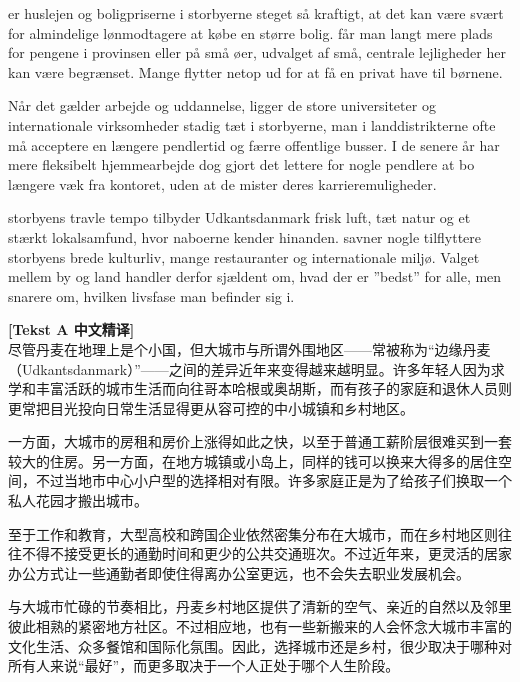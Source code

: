  er huslejen og boligpriserne i storbyerne steget så kraftigt, at det kan være svært for almindelige lønmodtagere at købe en større bolig.  får man langt mere plads for pengene i provinsen eller på små øer,  udvalget af små, centrale lejligheder her kan være begrænset. Mange flytter netop ud for at få en privat have til børnene.

Når det gælder arbejde og uddannelse, ligger de store universiteter og internationale virksomheder stadig tæt i storbyerne,  man i landdistrikterne  ofte må acceptere en længere pendlertid og færre offentlige busser. I de senere år har mere fleksibelt hjemmearbejde dog gjort det lettere for nogle pendlere at bo længere væk fra kontoret, uden at de mister deres karrieremuligheder.

 storbyens travle tempo tilbyder Udkantsdanmark frisk luft, tæt natur og et stærkt lokalsamfund, hvor naboerne kender hinanden.  savner nogle tilflyttere storbyens brede kulturliv, mange restauranter og internationale miljø. Valget mellem by og land handler derfor sjældent om, hvad der er ”bedst” for alle, men snarere om, hvilken livsfase man befinder sig i.

\begin{transbox}
\small
\textbf{\color{NCDTeal}[Tekst A 中文精译]}\\
尽管丹麦在地理上是个小国，但大城市与所谓外围地区——常被称为“边缘丹麦（Udkantsdanmark）”——之间的差异近年来变得越来越明显。许多年轻人因为求学和丰富活跃的城市生活而向往哥本哈根或奥胡斯，而有孩子的家庭和退休人员则更常把目光投向日常生活显得更从容可控的中小城镇和乡村地区。

一方面，大城市的房租和房价上涨得如此之快，以至于普通工薪阶层很难买到一套较大的住房。另一方面，在地方城镇或小岛上，同样的钱可以换来大得多的居住空间，不过当地市中心小户型的选择相对有限。许多家庭正是为了给孩子们换取一个私人花园才搬出城市。

至于工作和教育，大型高校和跨国企业依然密集分布在大城市，而在乡村地区则往往不得不接受更长的通勤时间和更少的公共交通班次。不过近年来，更灵活的居家办公方式让一些通勤者即使住得离办公室更远，也不会失去职业发展机会。

与大城市忙碌的节奏相比，丹麦乡村地区提供了清新的空气、亲近的自然以及邻里彼此相熟的紧密地方社区。不过相应地，也有一些新搬来的人会怀念大城市丰富的文化生活、众多餐馆和国际化氛围。因此，选择城市还是乡村，很少取决于哪种对所有人来说“最好”，而更多取决于一个人正处于哪个人生阶段。
\end{transbox}

